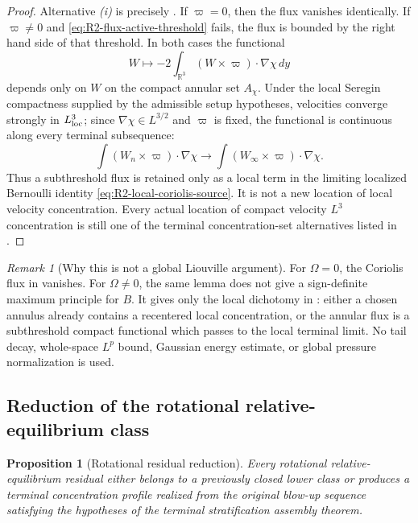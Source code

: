 \documentclass[11pt]{amsart}
\numberwithin{equation}{section}
\theoremstyle{plain}
\newtheorem{proposition}[proposition]{Proposition}
\theoremstyle{definition}
\theoremstyle{remark}
\newtheorem{remark}[remark]{Remark}
\begin{document}
\begin{proof}
Alternative \emph{(i)} is precisely
.  If \(\varpi=0\), then the flux
vanishes identically.  If \(\varpi\ne0\) and
\eqref{eq:R2-flux-active-threshold} fails, the flux is bounded by the right hand
side of that threshold.  In both cases the functional
\[
   W\longmapsto -2\int_{\mathbb R^3}(W\times\varpi)\cdot\nabla\chi\,dy
\]
depends only on \(W\) on the compact annular set \(A_\chi\).  Under the local
Seregin compactness supplied by the admissible setup hypotheses, velocities converge
strongly in
\(L^3_{\rm loc}\); since \(\nabla\chi\in L^{3/2}\) and \(\varpi\) is fixed, the
functional is continuous along every terminal subsequence:
\[
   \int (W_n\times\varpi)\cdot\nabla\chi
   \longrightarrow
   \int (W_\infty\times\varpi)\cdot\nabla\chi .
\]
Thus a subthreshold flux is retained only as a local term in the limiting
localized Bernoulli identity \eqref{eq:R2-local-coriolis-source}.  It is not a
new location of local velocity concentration.  Every actual location of compact velocity
\(L^3\) concentration is still one of the terminal concentration-set alternatives listed in
.
\end{proof}

\begin{remark}[Why this is not a global Liouville argument]
\label{rem:R2-no-global-liouville}
For \(\Omega=0\), the Coriolis flux in
 vanishes.  For \(\Omega\ne0\), the
same lemma does not give a sign-definite maximum principle for \(B\).  It gives
only the local dichotomy in : either a
chosen annulus already contains a recentered local concentration, or the
annular flux is a subthreshold compact functional which passes to the local
terminal limit.  No tail decay, whole-space \(L^p\) bound, Gaussian energy
estimate, or global pressure normalization is used.
\end{remark}

\subsection{Reduction of the rotational relative-equilibrium class}

\begin{proposition}[Rotational residual reduction]
\label{prop:R2-reduction-to-terminal}
Every rotational relative-equilibrium residual either belongs to a previously
closed lower class or produces a terminal concentration profile realized from
the original blow-up sequence
satisfying the hypotheses of the terminal stratification assembly theorem.
\end{proposition}
\end{document}
